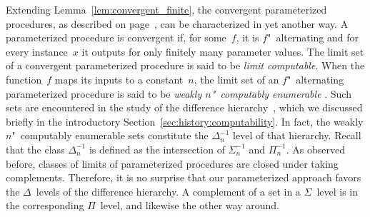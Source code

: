 Extending Lemma~\ref{lem:convergent_finite}, the convergent parameterized procedures, as described on page~\pageref{def:convergent}, can be characterized in yet another way.
A parameterized procedure is convergent if, for some~$f$, it is $f$"~alternating and for every instance~$x$ it outputs  for only finitely many parameter values.
The limit set of a convergent parameterized procedure is said to be \emph{limit computable}.
When the function~$f$ maps its inputs to a constant~$n$, the limit set of an $f$"~alternating parameterized procedure is said to be \emph{weakly $n$"~computably enumerable} \parencite{odifreddi1992classical,epstein1981hierarchies}.
Such sets are encountered in the study of the difference hierarchy~\parencite{downey2010algorithmic}, which we discussed briefly in the introductory Section~\ref{sec:history:computability}.
In fact, the weakly $n$"~computably enumerable sets constitute the $\Delta^{-1}_n$ level of that hierarchy.
Recall that the class $\Delta^{-1}_n$ is defined as the intersection of $\Sigma^{-1}_n$ and $\Pi^{-1}_n$.
As observed before, classes of limits of parameterized procedures are closed under taking complements.
Therefore, it is no surprise that our parameterized approach favors the $\Delta$~levels of the difference hierarchy.
A complement of a set in a $\Sigma$~level is in the corresponding $\Pi$~level, and likewise the other way around.

